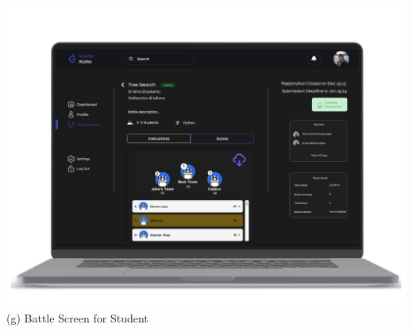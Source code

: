 \begin{center}
\includegraphics[scale=0.13]{Images/ui-ux/student_battle/student_battle_4.png}
      (g) Battle Screen for Student
\end{center}

